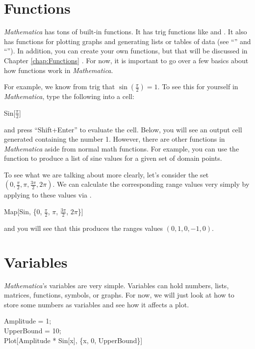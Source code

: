 \section{Functions}
\emph{Mathematica} has tons of built-in functions. It has trig functions like  and . It also has functions for plotting graphs and generating lists or tables of data (see ``'' and ``''). In addition, you can create your own functions, but that will be discussed in Chapter \ref{chap:Functions} . For now, it is important to go over a few basics about how functions work in \emph{Mathematica}.

For example, we know from trig that $\sin(\frac{\pi}{2}) = 1$. To see this for yourself in \emph{Mathematica}, type the following into a cell:

\begin{code}
	   Sin[$\frac{\pi}{2}$]
\end{code}
and press ``Shift+Enter'' to evaluate the cell. Below, you will see an output cell generated containing the number 1. However, there are other functions in \emph{Mathematica} aside from normal math functions. For example, you can use the  function to produce a list of sine values for a given set of domain points. 

To see what we are talking about more clearly, let's consider the set $(0, \frac{\pi}{2}, \pi, \frac{3\pi}{2}, 2\pi)$. We can calculate the corresponding range values very simply by applying  to these values via .

\begin{code}
	   Map[Sin, \{0, $\frac{\pi}{2}$, $\pi$, $\frac{3\pi}{2}$, $2\pi$\}]
\end{code}
and you will see that this produces the ranges values $(0, 1, 0, -1, 0)$.

\section{Variables}
\emph{Mathematica}'s variables are very simple. Variables can hold numbers, lists, matrices, functions, symbols, or graphs. For now, we will just look at how to store some numbers as variables and see how it affects a plot.

\begin{code}
	   Amplitude = 1;\\
	   UpperBound = 10;\\
	   Plot[Amplitude * Sin[x], \{x, 0, UpperBound\}]
\end{code}

